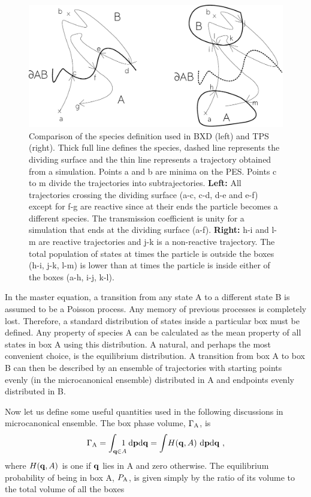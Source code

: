 \begin{figure}[h]
\centering
\includegraphics[width=14cm]{Images/recrossing.pdf}
\caption[Comparison of species definitions.]{Comparison of the species definition used in BXD (left) and TPS (right). Thick full line defines the species, dashed line represents the dividing surface and the thin line represents a trajectory obtained from a simulation. Points a and b are minima on the PES. Points c to m divide the trajectories into subtrajectories. {\bf Left:} All trajectories crossing the dividing surface (a-c, c-d, d-e and e-f) except for f-g are reactive since at their ends the particle becomes a different species. The transmission coefficient is unity for a simulation that ends at the dividing surface (a-f). {\bf Right:} h-i and l-m are reactive trajectories and j-k is a non-reactive trajectory. The total population of states at times the particle is outside the boxes (h-i, j-k, l-m) is lower than at times the particle is inside either of the boxes (a-h, i-j, k-l).}
\label{fig:recross}
\end{figure}


In the master equation, a transition from any state A to a different state B is assumed to be a Poisson process.
Any memory of previous processes is completely lost.
Therefore, a standard distribution of states inside a particular box must be defined.
Any property of species A can be calculated as the mean property of all states in box A using this distribution.
A natural, and perhaps the most convenient choice, is the equilibrium distribution.
A transition from box A to box B can then be described by an ensemble of trajectories with starting points evenly (in the microcanonical ensemble) distributed in A and endpoints evenly distributed in B.

Now let us define some useful quantities used in the following discussions in microcanonical ensemble.
The box phase volume, \(\Gamma_{\rm A}\), is
\begin{equation}
\label{eq:gamma}
\Gamma_{\rm A }
= \int_{{\bf q} \in A} \!\!\!\!\! 1 ~ {\rm d}{\bf p} {\rm d}{\bf q} 
= \int \! H({\bf q}, A) ~ {\rm d}{\bf p} {\rm d}{\bf q} \rm ~,
\end{equation}
where $H({\bf q}, A)$ is one if ${\bf q}$ lies in A and zero otherwise.
The equilibrium probability of being in box A, $P_{\rm A}$, is given simply by the ratio of its volume to the total volume of all the boxes

